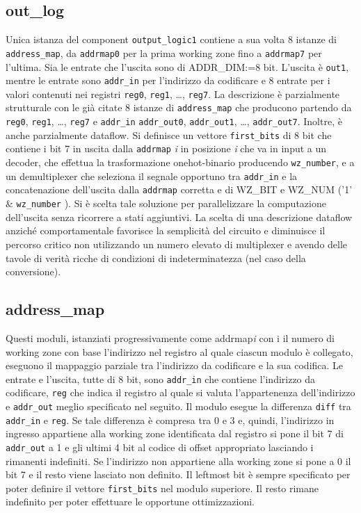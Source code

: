 \documentclass [a4paper, 12pt]{article}
\begin{document}
\subsection{out\_log}
Unica istanza del component \texttt{output\_logic1} contiene a sua volta 8 istanze di \texttt{address\_map}, da \texttt{addrmap0} per la prima working zone fino a \texttt{addrmap7} per l'ultima. Sia le entrate che l'uscita sono di ADDR\_DIM:=8 bit. L'uscita \`e \texttt{out1}, mentre le entrate sono \texttt{addr\_in} per l'indirizzo da codificare e 8 entrate per i valori contenuti nei registri \texttt{reg0}, \texttt{reg1}, \dots, \texttt{reg7}. La descrizione \`e parzialmente strutturale con le gi\`a citate 8 istanze di \texttt{address\_map} che producono partendo da \texttt{reg0}, \texttt{reg1}, \dots, \texttt{reg7} e \texttt{addr\_in} \texttt{addr\_out0}, \texttt{addr\_out1}, \dots, \texttt{addr\_out7}. Inoltre, \`e anche parzialmente dataflow. Si definisce un vettore \texttt{first\_bits} di 8 bit che contiene i bit 7 in uscita dalla \texttt{addrmap} \textit{i} in posizione \textit{i} che va in input a un decoder, che effettua la trasformazione onehot-binario producendo \texttt{wz\_number}, e a un demultiplexer che seleziona il segnale opportuno tra \texttt{addr\_in} e la concatenazione dell'uscita dalla \texttt{addrmap} corretta e di WZ\_BIT e WZ\_NUM ('1' \& \texttt{wz\_number} ). 
Si \`e scelta tale soluzione per parallelizzare la computazione dell'uscita senza ricorrere a stati aggiuntivi. La scelta di una descrizione dataflow anzich\'e comportamentale favorisce la semplicit\`a del circuito e diminuisce il percorso critico non utilizzando un numero elevato di multiplexer e avendo delle tavole di verit\`a ricche di condizioni di indeterminatezza  (nel caso della conversione).



\subsection{address\_map}
Questi moduli, istanziati progressivamente come addrmap\textit{i} con i il numero di working zone con base l'indirizzo nel registro al quale ciascun modulo \`e collegato, eseguono il mappaggio parziale tra l'indirizzo da codificare e la sua codifica. Le entrate e l'uscita, tutte di 8 bit, sono \texttt{addr\_in} che contiene l'indirizzo da codificare, \texttt{reg} che indica il registro al quale si valuta l'appartenenza dell'indirizzo e \texttt{addr\_out} meglio specificato nel seguito. Il modulo esegue la differenza \texttt{diff} tra \texttt{addr\_in} e \texttt{reg}. Se tale differenza \`e compresa tra 0 e 3 e, quindi, l'indirizzo in ingresso appartiene alla working zone identificata dal registro si pone il bit 7 di \texttt{addr\_out} a 1 e gli ultimi 4 bit al codice di offset appropriato lasciando i rimanenti indefiniti. Se l'indirizzo non appartiene alla working zone si pone a 0 il bit 7 e il resto viene lasciato non definito. Il leftmost bit \`e sempre specificato per poter definire il vettore \texttt{first\_bits} nel modulo superiore. Il resto rimane indefinito per poter effettuare le opportune ottimizzazioni. 
\end{document}
